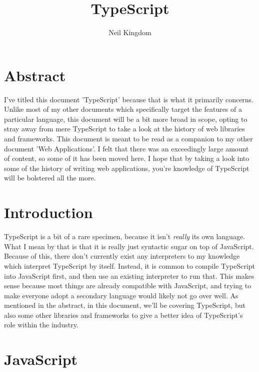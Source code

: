 \documentclass{article}
\title{TypeScript}
\author{Neil Kingdom}
\begin{document}
\begin{titlingpage}

\maketitle

\end{titlingpage}

\newpage

\tableofcontents

\newpage

\section{Abstract}

I've titled this document 'TypeScript' because that is what it primarily concerns. Unlike most of my other
documents which specifically target the features of a particular language, this document will be a bit more
broad in scope, opting to stray away from mere TypeScript to take a look at the history of web libraries and
frameworks. This document is meant to be read as a companion to my other document 'Web Applications'. I felt
that there was an exceedingly large amount of content, so some of it has been moved here. I hope that by taking
a look into some of the history of writing web applications, you're knowledge of TypeScript will be bolstered
all the more.

\section{Introduction}

TypeScript is a bit of a rare specimen, because it isn't \emph{really} its own language. What I mean by that is
that it is really just syntactic sugar on top of JavaScript. Because of this, there don't currently exist any
interpreters to my knowledge which interpret TypeScript by itself. Instead, it is common to compile TypeScript
into JavaScript first, and then use an existing interpreter to run that. This makes sense because most things
are already compatible with JavaScript, and trying to make everyone adopt a secondary language would likely not
go over well. As mentioned in the abstract, in this document, we'll be covering TypeScript, but also some other
libraries and frameworks to give a better idea of TypeScript's role within the industry.

\section{JavaScript}
\end{document}
